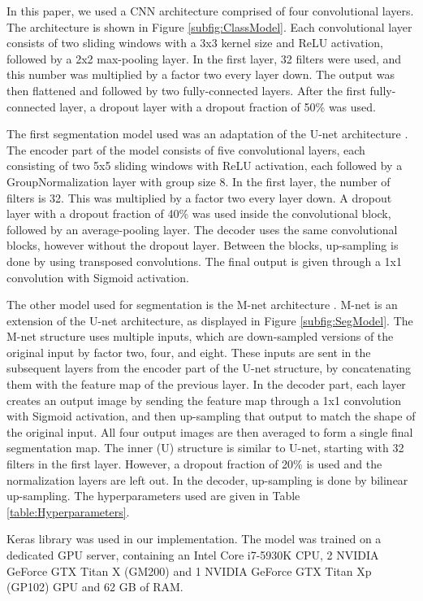 
In this paper, we used a CNN architecture comprised of four convolutional layers. The architecture is shown in Figure \ref{subfig:ClassModel}. Each convolutional layer consists of two sliding windows with a 3x3 kernel size and ReLU activation, followed by a 2x2 max-pooling layer. In the first layer, 32 filters were used, and this number was multiplied by a factor two every layer down. The output was then flattened and followed by two fully-connected layers. After the first fully-connected layer, a dropout layer with a dropout fraction of 50\% was used.

The first segmentation model used was an adaptation of the U-net architecture \cite{UNetArticle}. The encoder part of the model consists of five convolutional layers, each consisting of two 5x5 sliding windows with ReLU activation, each followed by a GroupNormalization layer with group size 8. In the first layer, the number of filters is 32. This was multiplied by a factor two every layer down. A dropout layer with a dropout fraction of 40\% was used inside the convolutional block, followed by an average-pooling layer. The decoder uses the same convolutional blocks, however without the dropout layer. Between the blocks, up-sampling is done by using transposed convolutions. The final output is given through a 1x1 convolution with Sigmoid activation.

The other model used for segmentation is the M-net architecture \cite{Abraham2019}. M-net is an extension of the U-net architecture, as displayed in Figure \ref{subfig:SegModel}. The M-net structure uses multiple inputs, which are down-sampled versions of the original input by factor two, four, and eight. These inputs are sent in the subsequent layers from the encoder part of the U-net structure, by concatenating them with the feature map of the previous layer. In the decoder part, each layer creates an output image by sending the feature map through a 1x1 convolution with Sigmoid activation, and then up-sampling that output to match the shape of the original input. All four output images are then averaged to form a single final segmentation map. The inner (U) structure is similar to U-net, starting with 32 filters in the first layer. However, a dropout fraction of 20\% is used and the normalization layers are left out. In the decoder, up-sampling is done by bilinear up-sampling. The hyperparameters used are given in Table \ref{table:Hyperparameters}. 


Keras library \cite{Keras} was used in our implementation. The model was trained on a dedicated GPU server, containing an Intel Core i7-5930K CPU, 2 NVIDIA GeForce GTX Titan X (GM200) and 1 NVIDIA GeForce GTX Titan Xp (GP102) GPU and 62 GB of RAM.


